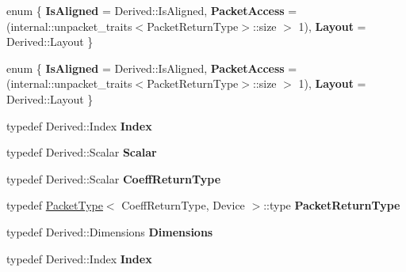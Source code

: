 \begin{DoxyCompactItemize}
\item 
\mbox{\label{struct_eigen_1_1_tensor_evaluator_acd1447d9ecaa239e96d8949e2c7724f4}} 
enum \{ {\bfseries Is\+Aligned} = Derived\+:\+:Is\+Aligned, 
{\bfseries Packet\+Access} = (internal\+:\+:unpacket\+\_\+traits$<$Packet\+Return\+Type$>$\+:\+:size $>$ 1), 
{\bfseries Layout} = Derived\+:\+:Layout
 \}
\item 
\mbox{\label{struct_eigen_1_1_tensor_evaluator_a89a733eacb0dd8a051fb66c5ce66d2f0}} 
enum \{ {\bfseries Is\+Aligned} = Derived\+:\+:Is\+Aligned, 
{\bfseries Packet\+Access} = (internal\+:\+:unpacket\+\_\+traits$<$Packet\+Return\+Type$>$\+:\+:size $>$ 1), 
{\bfseries Layout} = Derived\+:\+:Layout
 \}
\item 
\mbox{\label{struct_eigen_1_1_tensor_evaluator_a932b320bc0d4f0c027d28f6f9918bbc6}} 
typedef Derived\+::\+Index {\bfseries Index}
\item 
\mbox{\label{struct_eigen_1_1_tensor_evaluator_a163cadb184cc08462355caf1031115a4}} 
typedef Derived\+::\+Scalar {\bfseries Scalar}
\item 
\mbox{\label{struct_eigen_1_1_tensor_evaluator_a664eb29b0c38061939b400fbc551c580}} 
typedef Derived\+::\+Scalar {\bfseries Coeff\+Return\+Type}
\item 
\mbox{\label{struct_eigen_1_1_tensor_evaluator_abe9fdcfec79a555a6762f8443c6a6a2c}} 
typedef \hyperlink{struct_eigen_1_1_packet_type}{Packet\+Type}$<$ Coeff\+Return\+Type, Device $>$\+::type {\bfseries Packet\+Return\+Type}
\item 
\mbox{\label{struct_eigen_1_1_tensor_evaluator_ac4139a59583bb1e6385d3a0195548b6b}} 
typedef Derived\+::\+Dimensions {\bfseries Dimensions}
\item 
\mbox{\label{struct_eigen_1_1_tensor_evaluator_a932b320bc0d4f0c027d28f6f9918bbc6}} 
typedef Derived\+::\+Index {\bfseries Index}
\item 

\end{DoxyCompactItemize}
